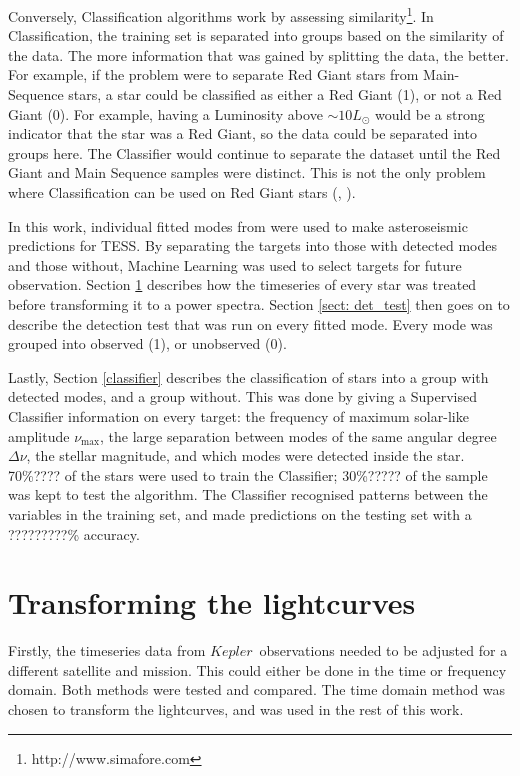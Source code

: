\documentclass[a4paper,fleqn,usenatbib,useAMS]{mnras}
\newcommand{\numax}{\ensuremath{\nu_{\textrm{max}}}}
\newcommand{\dnu}{\ensuremath{\Delta\nu}}
\newcommand{\kep}{\ensuremath{Kepler}}
\begin{document}
Conversely, Classification algorithms work by assessing similarity\footnote{http://www.simafore.com}. In Classification, the training set is separated into groups based on the similarity of the data. The more information that was gained by splitting the data, the better. For example, if the problem were to separate Red Giant stars from Main-Sequence stars, a star could be classified as either a Red Giant (1), or not a Red Giant (0). For example, having a Luminosity above $\sim10L_{\odot}$ would be a strong indicator that the star was a Red Giant, so the data could be separated into groups here. The Classifier would continue to separate the dataset until the Red Giant and Main Sequence samples were distinct. This is not the only problem where Classification can be used on Red Giant stars (\citet{ness_cannon_2015}, \citet{wu_mass_2017}).

In this work, individual fitted modes from \citet{davies_asteroseismology_2016} were used to make asteroseismic predictions for TESS. By separating the targets into those with detected modes and those without, Machine Learning was used to select targets for future observation. Section \ref{sect: dataset} describes how the timeseries of every star was treated before transforming it to a power spectra. Section \ref{sect: det_test} then goes on to describe the detection test that was run on every fitted mode. Every mode was grouped into observed (1), or unobserved (0).

Lastly, Section \ref{classifier} describes the classification of stars into a group with detected modes, and a group without. This was done by giving a Supervised Classifier information on every target: the frequency of maximum solar-like amplitude \numax, the large separation between modes of the same angular degree \dnu, the stellar magnitude, and which modes were detected inside the star. 70\%???? of the stars were used to train the Classifier; 30\%????? of the sample was kept to test the algorithm. The Classifier recognised patterns between the variables in the training set, and made predictions on the testing set with a ?????????\% accuracy. 


\iffalse
\section{Transforming the lightcurves}
\label{sect: dataset}

Firstly, the timeseries data from \kep \ observations needed to be adjusted for a different satellite and mission. This could either be done in the time or frequency domain. Both methods were tested and compared. The time domain method was chosen to transform the lightcurves, and was used in the rest of this work.
\end{document}
